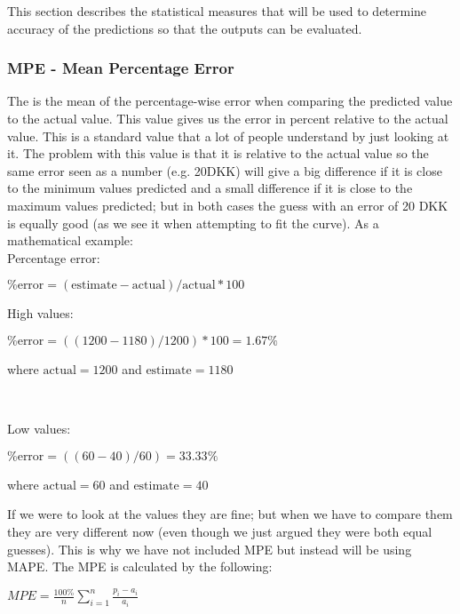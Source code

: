 This section describes the statistical measures that will be used to determine accuracy of the predictions so that the outputs can be evaluated.

\subsubsection{MPE - Mean Percentage Error}
The  is the mean of the percentage-wise error when comparing the predicted value to the actual value. This value gives us the error in percent relative to the actual value. This is a standard value that a lot of people understand by just looking at it. The problem with this value is that it is relative to the actual value so the same error seen as a number (e.g. 20DKK) will give a big difference if it is close to the minimum values predicted and a small difference if it is close to the maximum values predicted; but in both cases the guess with an error of 20 DKK is equally good (as we see it when attempting to fit the curve). As a mathematical example:
\\[0.5cm]
\noindent Percentage error:
\begin{center}
$\text{\% error} = (\text{estimate} - \text{actual}) / \text{actual} * 100$
\end{center}
\begin{minipage}{\textwidth}
\noindent High values:
\begin{center}
$\text{\% error} = ((1200-1180)/1200)*100 = 1.67\%$
\end{center}
\noindent where $\text{actual} = 1200$ and $\text{estimate} = 1180$
\end{minipage}
\\[0.5cm]
\begin{minipage}{\textwidth}
\noindent Low values: 
\begin{center}
$\text{\% error} = ((60-40)/60) = 33.33\%$
\end{center}
\noindent where $\text{actual} = 60$ and $\text{estimate} = 40$
\\[0.5cm]
\end{minipage}
\noindent If we were to look at the values they are fine; but when we have to compare them they are very different now (even though we just argued they were both equal guesses). This is why we have not included MPE but instead will be using MAPE.
The MPE is calculated by the following:
\begin{center}
$ MPE = \frac{100\%}{n}\sum_{i=1}^{n}\frac{p_i - a_i}{a_i} $
\end{center}

